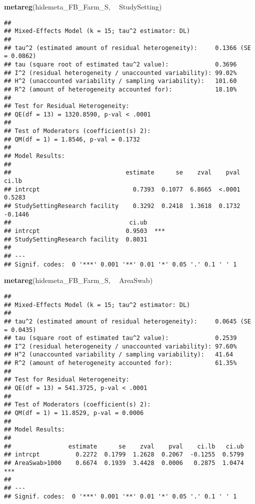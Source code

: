 \documentclass[]{article}
\newenvironment{Shaded}{\begin{snugshade}}{\end{snugshade}}
\newcommand{\KeywordTok}[1]{\textcolor[rgb]{0.13,0.29,0.53}{\textbf{#1}}}
\newcommand{\StringTok}[1]{\textcolor[rgb]{0.31,0.60,0.02}{#1}}
\newcommand{\OperatorTok}[1]{\textcolor[rgb]{0.81,0.36,0.00}{\textbf{#1}}}
\newcommand{\NormalTok}[1]{#1}
\begin{document}
\begin{Shaded}
\begin{Highlighting}[]
\KeywordTok{metareg}\NormalTok{(hidemeta_FB_Farm_S, }\OperatorTok{~}\StringTok{ }\NormalTok{StudySetting)}
\end{Highlighting}
\end{Shaded}

\begin{verbatim}
## 
## Mixed-Effects Model (k = 15; tau^2 estimator: DL)
## 
## tau^2 (estimated amount of residual heterogeneity):     0.1366 (SE = 0.0862)
## tau (square root of estimated tau^2 value):             0.3696
## I^2 (residual heterogeneity / unaccounted variability): 99.02%
## H^2 (unaccounted variability / sampling variability):   101.60
## R^2 (amount of heterogeneity accounted for):            18.10%
## 
## Test for Residual Heterogeneity: 
## QE(df = 13) = 1320.8590, p-val < .0001
## 
## Test of Moderators (coefficient(s) 2): 
## QM(df = 1) = 1.8546, p-val = 0.1732
## 
## Model Results:
## 
##                                estimate      se    zval    pval    ci.lb
## intrcpt                          0.7393  0.1077  6.8665  <.0001   0.5283
## StudySettingResearch facility    0.3292  0.2418  1.3618  0.1732  -0.1446
##                                 ci.ub     
## intrcpt                        0.9503  ***
## StudySettingResearch facility  0.8031     
## 
## ---
## Signif. codes:  0 '***' 0.001 '**' 0.01 '*' 0.05 '.' 0.1 ' ' 1
\end{verbatim}

\begin{Shaded}
\begin{Highlighting}[]
\KeywordTok{metareg}\NormalTok{(hidemeta_FB_Farm_S, }\OperatorTok{~}\StringTok{ }\NormalTok{AreaSwab)}
\end{Highlighting}
\end{Shaded}

\begin{verbatim}
## 
## Mixed-Effects Model (k = 15; tau^2 estimator: DL)
## 
## tau^2 (estimated amount of residual heterogeneity):     0.0645 (SE = 0.0435)
## tau (square root of estimated tau^2 value):             0.2539
## I^2 (residual heterogeneity / unaccounted variability): 97.60%
## H^2 (unaccounted variability / sampling variability):   41.64
## R^2 (amount of heterogeneity accounted for):            61.35%
## 
## Test for Residual Heterogeneity: 
## QE(df = 13) = 541.3725, p-val < .0001
## 
## Test of Moderators (coefficient(s) 2): 
## QM(df = 1) = 11.8529, p-val = 0.0006
## 
## Model Results:
## 
##                estimate      se    zval    pval    ci.lb   ci.ub     
## intrcpt          0.2272  0.1799  1.2628  0.2067  -0.1255  0.5799     
## AreaSwab>1000    0.6674  0.1939  3.4428  0.0006   0.2875  1.0474  ***
## 
## ---
## Signif. codes:  0 '***' 0.001 '**' 0.01 '*' 0.05 '.' 0.1 ' ' 1
\end{verbatim}
\end{document}
